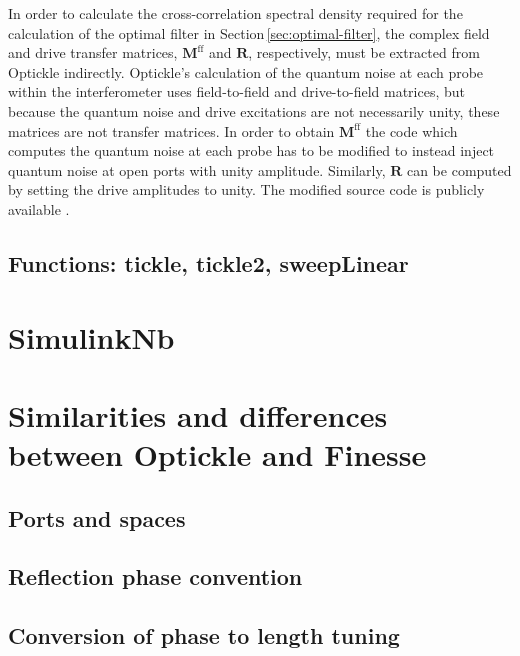In order to calculate the cross-correlation spectral density required for the calculation of the optimal filter in Section\,\ref{sec:optimal-filter}, the complex field and drive transfer matrices, $\mathbf{M}^{\textrm{ff}}$ and $\mathbf{R}$, respectively, must be extracted from Optickle indirectly. Optickle's calculation of the quantum noise at each probe within the interferometer uses field-to-field and drive-to-field matrices, but because the quantum noise and drive excitations are not necessarily unity, these matrices are not transfer matrices. In order to obtain $\mathbf{M}^{\textrm{ff}}$ the code which computes the quantum noise at each probe has to be modified to instead inject quantum noise at open ports with unity amplitude. Similarly, $\mathbf{R}$ can be computed by setting the drive amplitudes to unity. The modified source code is publicly available \cite{controlspaperdata}.

\subsection{Functions: tickle, tickle2, sweepLinear}

\section{\label{sec:simulinknb-sim}SimulinkNb}
\cite{SimulinkNb}

\section{Similarities and differences between Optickle and Finesse}

\subsection{Ports and spaces}

\subsection{Reflection phase convention}
\label{a:reflection-phase}

\subsection{Conversion of phase to length tuning}

